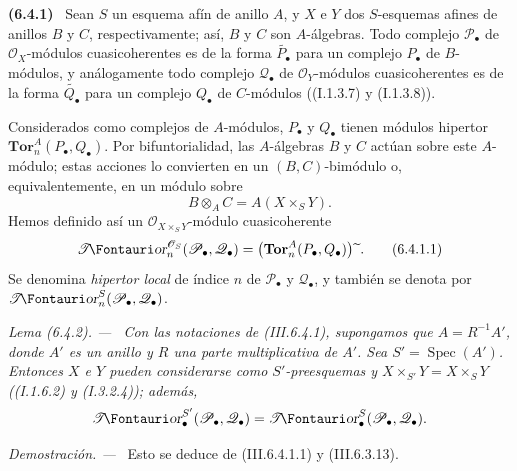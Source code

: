 \documentclass[10pt,oneside]{book}
\makeatletter
\newcommand{\sh}[1]{\mathscr{#1}}
\newcommand*{\ega@sheafop}[3]{\sh{#1}#2\textup{\kern-2.2pt{\Fontauri\slshape #3}}}
\newcommand{\shTor}{\ega@sheafop{T}{}{or}}
\newcommand{\supertilde}{{\,\widetilde{\,}\,}}
\newcommand{\Spec}{\operatorname{Spec}}
\newcommand{\sref}[2][]{\textup{(#2)}}
\newenvironment{env}[1][]{\par\medskip\noindent\textbf{(#1)}\ }{\par}
\newenvironment{lemma}[1][]{\par\medskip\noindent\itshape Lema (#1). ---\ }{\par}
\newenvironment{proof}{\par\medskip\noindent\textit{Demostración. ---\ }}{\par}
\makeatother
\begin{document}
\begin{env}[6.4.1]
\label{III.6.4.1}
Sean $S$ un esquema afín de anillo $A$, y $X$ e $Y$ dos
$S$-esquemas afines de anillos $B$ y $C$, respectivamente; así,
$B$ y $C$ son $A$-álgebras. Todo complejo $\sh P_\bullet$ de
$\sh O_X$-módulos cuasicoherentes es de la forma
$\widetilde{P_\bullet}$ para un complejo $P_\bullet$ de
$B$-módulos, y análogamente todo complejo $\sh Q_\bullet$ de
$\sh O_Y$-módulos cuasicoherentes es de la forma
$\widetilde{Q_\bullet}$ para un complejo $Q_\bullet$ de
$C$-módulos (\sref[I]{I.1.3.7} y \sref[I]{I.1.3.8}).

Considerados como complejos de $A$-módulos, $P_\bullet$ y
$Q_\bullet$ tienen módulos hipertor
$\mathbf{Tor}_n^A(P_\bullet,Q_\bullet)$. Por bifuntorialidad, las
$A$-álgebras $B$ y $C$ actúan sobre este $A$-módulo; estas acciones
lo convierten en un $(B,C)$-bimódulo o, equivalentemente, en un
módulo sobre
\[
  B\otimes_AC=A(X\times_SY).
\]
Hemos definido así un $\sh O_{X\times_SY}$-módulo cuasicoherente
\[
  \boldsymbol{\shTor}_n^{\sh O_S}(\sh P_\bullet,\sh Q_\bullet)
  =
  \bigl(\mathbf{Tor}_n^A(P_\bullet,Q_\bullet)\bigr)\supertilde.
  \tag{6.4.1.1}\label{III.6.4.1.1}
\]
Se denomina \emph{hipertor local} de índice $n$ de
$\sh P_\bullet$ y $\sh Q_\bullet$, y también se denota por
$\boldsymbol{\shTor}_n^S(\sh P_\bullet,\sh Q_\bullet)$.
\end{env}

\begin{lemma}[6.4.2]
\label{III.6.4.2}
Con las notaciones de \sref{III.6.4.1}, supongamos que
$A=R^{-1}A'$, donde $A'$ es un anillo y $R$ una parte
multiplicativa de $A'$. Sea $S'=\Spec(A')$. Entonces $X$ e $Y$
pueden considerarse como $S'$-preesquemas y
$X\times_{S'}Y=X\times_SY$
\textup{(}\sref[I]{I.1.6.2} y \sref[I]{I.3.2.4}\textup{)}; además,
\[
  \boldsymbol{\shTor}_\bullet^{S'}(\sh P_\bullet,\sh Q_\bullet)
  =
  \boldsymbol{\shTor}_\bullet^S(\sh P_\bullet,\sh Q_\bullet).
\]
\end{lemma}

\begin{proof}
Esto se deduce de \sref{III.6.4.1.1} y \sref{III.6.3.13}.
\end{proof}
\end{document}
